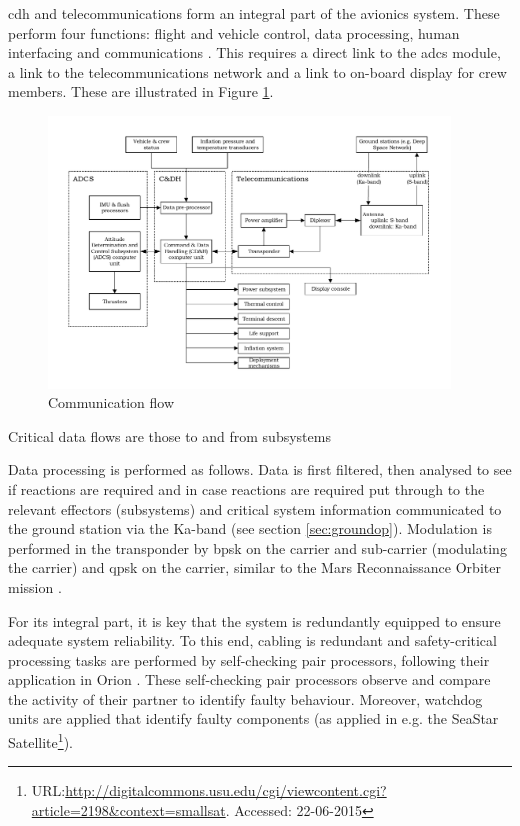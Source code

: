 \acrfull{cdh} and telecommunications form an integral part of the avionics system. These perform four functions: flight and vehicle control, data processing, human interfacing and communications \cite{Eger2008}. This requires a direct link to the \gls{adcs} module, a link to the telecommunications network and a link to on-board display for crew members. These are illustrated in Figure \ref{fig:cdhflow}.

\begin{figure}[h]
		\centering
		\includegraphics[width=0.95\textwidth]{./Figure/CrewModule/CDH.pdf}
		\caption{Communication flow}
		\label{fig:cdhflow}
\end{figure}

Critical data flows are those to and from subsystems

Data processing is performed as follows. Data is first filtered, then analysed to see if reactions are required and in case reactions are required put through to the relevant effectors (subsystems) and critical system information communicated to the ground station via the Ka-band (see section \ref{sec:groundop}). Modulation is performed in the transponder by \gls{bpsk} on the carrier and sub-carrier (modulating the carrier) and \gls{qpsk} on the carrier, similar to the Mars Reconnaissance Orbiter mission \cite{Taylor2006}.

For its integral part, it is key that the system is redundantly equipped to ensure adequate system reliability. To this end, cabling is redundant and safety-critical processing tasks are performed by self-checking pair processors, following their application in Orion \cite{Eger2008}. These self-checking pair processors observe and compare the activity of their partner to identify faulty behaviour. Moreover, watchdog units are applied that identify faulty components (as applied in e.g. the SeaStar Satellite\footnote{URL:\url{http://digitalcommons.usu.edu/cgi/viewcontent.cgi?article=2198&context=smallsat}. Accessed: 22-06-2015}).

